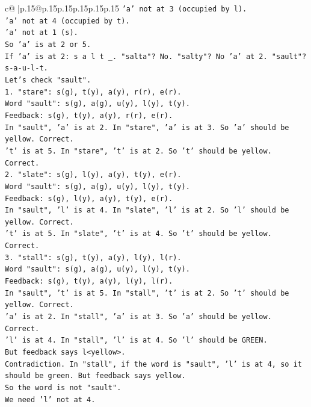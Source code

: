 \documentclass{article}
\begin{document}
{\begin{supertabular}{c@{$\;$}|p{.15\linewidth}@{}p{.15\linewidth}p{.15\linewidth}p{.15\linewidth}p{.15\linewidth}p{.15\linewidth}}
{{{\texttt{'a' not at 3 (occupied by l).} \\
\texttt{'a' not at 4 (occupied by t).} \\
\texttt{'a' not at 1 (s).} \\
\texttt{So 'a' is at 2 or 5.} \\
\texttt{If 'a' is at 2: s a l t \_. "salta"? No. "salty"? No 'a' at 2. "sault"? s{-}a{-}u{-}l{-}t.} \\
\texttt{Let's check "sault".} \\
\texttt{1. "stare": s(g), t(y), a(y), r(r), e(r).} \\
\texttt{Word "sault": s(g), a(g), u(y), l(y), t(y).} \\
\texttt{Feedback: s(g), t(y), a(y), r(r), e(r).} \\
\texttt{In "sault", 'a' is at 2. In "stare", 'a' is at 3. So 'a' should be yellow. Correct.} \\
\texttt{'t' is at 5. In "stare", 't' is at 2. So 't' should be yellow. Correct.} \\
\texttt{2. "slate": s(g), l(y), a(y), t(y), e(r).} \\
\texttt{Word "sault": s(g), a(g), u(y), l(y), t(y).} \\
\texttt{Feedback: s(g), l(y), a(y), t(y), e(r).} \\
\texttt{In "sault", 'l' is at 4. In "slate", 'l' is at 2. So 'l' should be yellow. Correct.} \\
\texttt{'t' is at 5. In "slate", 't' is at 4. So 't' should be yellow. Correct.} \\
\texttt{3. "stall": s(g), t(y), a(y), l(y), l(r).} \\
\texttt{Word "sault": s(g), a(g), u(y), l(y), t(y).} \\
\texttt{Feedback: s(g), t(y), a(y), l(y), l(r).} \\
\texttt{In "sault", 't' is at 5. In "stall", 't' is at 2. So 't' should be yellow. Correct.} \\
\texttt{'a' is at 2. In "stall", 'a' is at 3. So 'a' should be yellow. Correct.} \\
\texttt{'l' is at 4. In "stall", 'l' is at 4. So 'l' should be GREEN.} \\
\texttt{But feedback says l<yellow>.} \\
\texttt{Contradiction. In "stall", if the word is "sault", 'l' is at 4, so it should be green. But feedback says yellow.} \\
\texttt{So the word is not "sault".} \\
\texttt{We need 'l' not at 4.} \\
}}}
\end{supertabular}}
\end{document}
